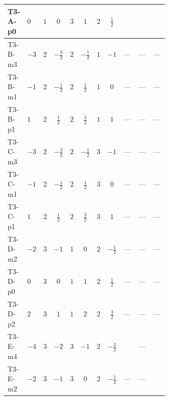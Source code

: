 \documentclass[8pt]{article}
\begin{document}
\begin{landscape}
\begin{longtable}{@{}llcccccc >{\raggedright\arraybackslash}p{0.21\linewidth} >{\raggedright\arraybackslash}p{0.21\linewidth} >{\raggedright\arraybackslash}p{0.21\linewidth}@{}}
\midrule
T3-A-p0 & $0$ & $1$ & $0$ & $3$ & $1$ & $2$ & $\frac{1}{2}$ & \scriptsize\adjustbox{max width=\linewidth}{$\begin{gathered} +\frac{3 {g_1}^4}{2}\end{gathered}$} & \scriptsize\adjustbox{max width=\linewidth}{$\begin{gathered} +\frac{{\lambda_{12}^{(1)}}^2}{4}\end{gathered}$} & \scriptsize\adjustbox{max width=\linewidth}{$\begin{gathered} +\frac{{\lambda_{HS_2}^{(1)}}^2}{2}\end{gathered}$} \\
\midrule
T3-B-m3 & $-3$ & $2$ & $-\frac{3}{2}$ & $2$ & $-\frac{1}{2}$ & $1$ & $-1$ & --- & --- & --- \\
\midrule
T3-B-m1 & $-1$ & $2$ & $-\frac{1}{2}$ & $2$ & $\frac{1}{2}$ & $1$ & $0$ & --- & --- & --- \\
\midrule
T3-B-p1 & $1$ & $2$ & $\frac{1}{2}$ & $2$ & $\frac{3}{2}$ & $1$ & $1$ & --- & --- & --- \\
\midrule
T3-C-m3 & $-3$ & $2$ & $-\frac{3}{2}$ & $2$ & $-\frac{1}{2}$ & $3$ & $-1$ & --- & --- & --- \\
\midrule
T3-C-m1 & $-1$ & $2$ & $-\frac{1}{2}$ & $2$ & $\frac{1}{2}$ & $3$ & $0$ & --- & --- & --- \\
\midrule
T3-C-p1 & $1$ & $2$ & $\frac{1}{2}$ & $2$ & $\frac{3}{2}$ & $3$ & $1$ & --- & --- & --- \\
\midrule
T3-D-m2 & $-2$ & $3$ & $-1$ & $1$ & $0$ & $2$ & $-\frac{1}{2}$ & --- & --- & --- \\
\midrule
T3-D-p0 & $0$ & $3$ & $0$ & $1$ & $1$ & $2$ & $\frac{1}{2}$ & --- & --- & --- \\
\midrule
T3-D-p2 & $2$ & $3$ & $1$ & $1$ & $2$ & $2$ & $\frac{3}{2}$ & --- & --- & --- \\
\midrule
T3-E-m4 & $-4$ & $3$ & $-2$ & $3$ & $-1$ & $2$ & $-\frac{3}{2}$ & \scriptsize\adjustbox{max width=\linewidth}{$\begin{gathered} +\frac{3 {g_1}^4}{2}\end{gathered}$} & --- & \scriptsize\adjustbox{max width=\linewidth}{$\begin{gathered} +\frac{{\lambda_{HS_2}^{(1)}}^2}{2}\end{gathered}$} \\
\midrule
T3-E-m2 & $-2$ & $3$ & $-1$ & $3$ & $0$ & $2$ & $-\frac{1}{2}$ & --- & --- & \scriptsize\adjustbox{max width=\linewidth}{$\begin{gathered} +\frac{{\lambda_{HS_2}^{(1)}}^2}{2}\end{gathered}$} \\

\end{longtable}
\end{landscape}
\end{document}
